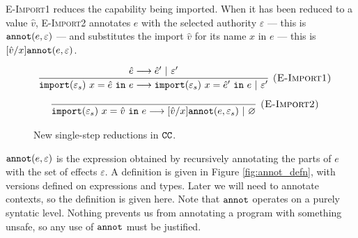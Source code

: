 \textsc{E-Import1} reduces the capability being imported. When it has been
reduced to a value $\hat v$, \textsc{E-Import2} annotates $e$ with the selected
authority $\varepsilon$ --- this is $\mathtt{annot}(e, \varepsilon)$ --- and
substitutes the import $\hat v$ for its name $x$ in $e$ --- this is
$[\hat v/x]\mathtt{annot}(e, \varepsilon)$.

\begin{figure}
\vspace*{-5mm}
\[
\begin{array}{c}
\infer[\textsc{(E-Import1)}]
	{\kwa{import}(\varepsilon_s)~x = \hat e~\kw{in} e \longrightarrow \kwa{import}(\varepsilon_s)~x = \hat e'~\kw{in} e~|~\varepsilon'}
	{\hat e \longrightarrow \hat e'~|~\varepsilon'}\\[2ex]

\infer[\textsc{(E-Import2)}]
	{\kwa{import}(\varepsilon_s)~x = \hat v~\kw{in} e \longrightarrow [\hat v/x]\kwa{annot}(e, \varepsilon_s)~|~\varnothing}
	{}
\end{array}
\]
\vspace*{-5mm}
\caption{New single-step reductions in $\mathtt{CC}$.}
\vspace*{-5mm}
\label{fig:epscalc_reductions}
\end{figure}

$\mathtt{annot}(e, \varepsilon)$ is the expression obtained by
recursively annotating the parts of $e$ with the set of effects
$\varepsilon$. A definition is given in Figure
\ref{fig:annot_defn}, with versions defined on expressions and types.
 Later we will need to annotate contexts, so
the definition is given here. Note that
$\mathtt{annot}$ operates on a purely syntatic level. Nothing prevents
us from annotating a program with something unsafe, so any use of
$\mathtt{annot}$ must be justified.

